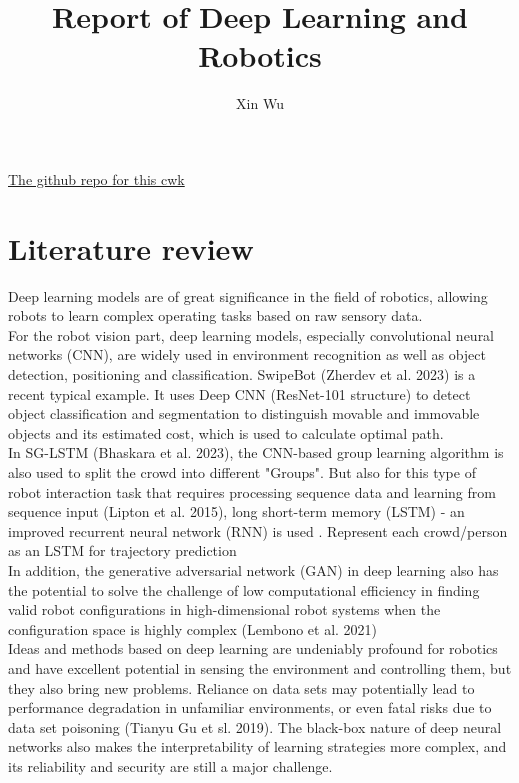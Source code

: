 \documentclass[12pt]{article}
\title{Report of Deep Learning and Robotics}
\author{Xin Wu}
\begin{document}
\maketitle
\href{https://github.com/LinearAlgebraX/DeepLearningRobotic_cwk}{The github repo for this cwk}

\section{Literature review}
Deep learning models are of great significance in the field of robotics, allowing robots to learn complex operating tasks based on raw sensory data.\\

For the robot vision part, deep learning models, especially convolutional neural networks (CNN), are widely used in environment recognition as well as object detection, 
positioning and classification. SwipeBot\cite{SwipeBot} (Zherdev et al. 2023) is a recent typical example. It uses Deep CNN (ResNet-101 structure) to detect object classification and segmentation to distinguish movable and immovable objects and its estimated cost, 
which is used to calculate optimal path.\\

In SG-LSTM\cite{SG} (Bhaskara et al. 2023), the CNN-based group learning algorithm is also used to split the crowd into different "Groups". 
But also for this type of robot interaction task that requires processing sequence data and learning from sequence input\cite{review} (Lipton et al. 2015), 
long short-term memory (LSTM) - an improved recurrent neural network (RNN) is used . Represent each crowd/person as an LSTM for trajectory prediction\\

In addition, the generative adversarial network (GAN) in deep learning also has the potential to solve the challenge of low computational efficiency in finding 
valid robot configurations in high-dimensional robot systems when the configuration space is highly complex\cite{GAN} (Lembono et al. 2021)\\

Ideas and methods based on deep learning are undeniably profound for robotics and have excellent potential in sensing the environment and controlling them, 
but they also bring new problems. Reliance on data sets may potentially lead to performance degradation in unfamiliar environments, 
or even fatal risks due to data set poisoning\cite{BadNet} (Tianyu Gu et sl. 2019). The black-box nature of deep neural networks also makes the interpretability of learning strategies more complex, 
and its reliability and security are still a major challenge.
\end{document}
